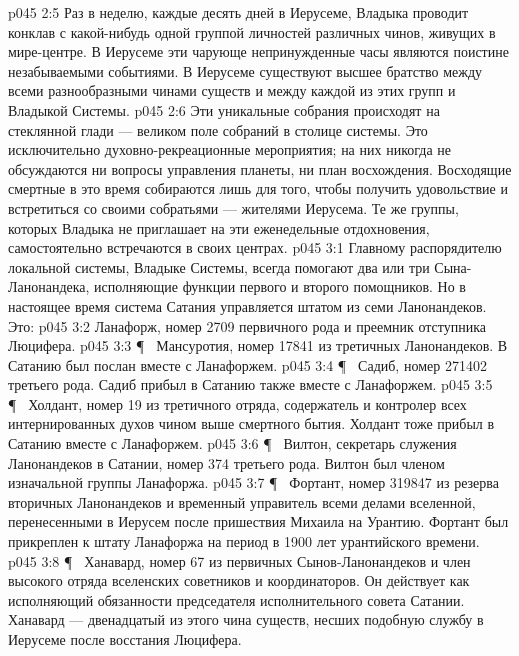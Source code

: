 \vs p045 2:5 Раз в неделю, каждые десять дней в Иерусеме, Владыка проводит конклав с какой\hyp{}нибудь одной группой личностей различных чинов, живущих в мире\hyp{}центре. В Иерусеме эти чарующе непринужденные часы являются поистине незабываемыми событиями. В Иерусеме существуют высшее братство между всеми разнообразными чинами существ и между каждой из этих групп и Владыкой Системы.
\vs p045 2:6 Эти уникальные собрания происходят на стеклянной глади --- великом поле собраний в столице системы. Это исключительно духовно\hyp{}рекреационные мероприятия; на них никогда не обсуждаются ни вопросы управления планеты, ни план восхождения. Восходящие смертные в это время собираются лишь для того, чтобы получить удовольствие и встретиться со своими собратьями --- жителями Иерусема. Те же группы, которых Владыка не приглашает на эти еженедельные отдохновения, самостоятельно встречаются в своих центрах.
\vs p045 3:1 Главному распорядителю локальной системы, Владыке Системы, всегда помогают два или три Сына\hyp{}Ланонандека, исполняющие функции первого и второго помощников. Но в настоящее время система Сатания управляется штатом из семи Ланонандеков. Это:
\vs p045 3:2 \bibnobreakspace {} Ланафорж, номер 2709 первичного рода и преемник отступника Люцифера.
\vs p045 3:3 \P\ \bibnobreakspace {} Мансуротия, номер 17841 из третичных Ланонандеков. В Сатанию был послан вместе с Ланафоржем.
\vs p045 3:4 \P\ \bibnobreakspace {} Садиб, номер 271402 третьего рода. Садиб прибыл в Сатанию также вместе с Ланафоржем.
\vs p045 3:5 \P\ \bibnobreakspace {} Холдант, номер 19 из третичного отряда, содержатель и контролер всех интернированных духов чином выше смертного бытия. Холдант тоже прибыл в Сатанию вместе с Ланафоржем.
\vs p045 3:6 \P\ \bibnobreakspace {} Вилтон, секретарь служения Ланонандеков в Сатании, номер 374 третьего рода. Вилтон был членом изначальной группы Ланафоржа.
\vs p045 3:7 \P\ \bibnobreakspace {} Фортант, номер 319847 из резерва вторичных Ланонандеков и временный управитель всеми делами вселенной, перенесенными в Иерусем после пришествия Михаила на Урантию. Фортант был прикреплен к штату Ланафоржа на период в 1900 лет урантийского времени.
\vs p045 3:8 \P\ \bibnobreakspace {} Ханавард, номер 67 из первичных Сынов\hyp{}Ланонандеков и член высокого отряда вселенских советников и координаторов. Он действует как исполняющий обязанности председателя исполнительного совета Сатании. Ханавард --- двенадцатый из этого чина существ, несших подобную службу в Иерусеме после восстания Люцифера.
